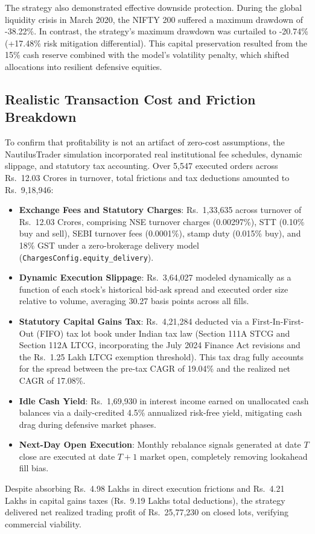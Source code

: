 The strategy also demonstrated effective downside protection. During the global liquidity crisis in March 2020, the NIFTY 200 suffered a maximum drawdown of -38.22\%. In contrast, the strategy's maximum drawdown was curtailed to -20.74\% (+17.48\% risk mitigation differential). This capital preservation resulted from the 15\% cash reserve combined with the model's volatility penalty, which shifted allocations into resilient defensive equities.

\subsection{Realistic Transaction Cost and Friction Breakdown}
To confirm that profitability is not an artifact of zero-cost assumptions, the NautilusTrader simulation incorporated real institutional fee schedules, dynamic slippage, and statutory tax accounting. Over 5,547 executed orders across \textsf{Rs.~}12.03 Crores in turnover, total frictions and tax deductions amounted to \textsf{Rs.~}9,18,946:
\begin{itemize}
    \item \textbf{Exchange Fees and Statutory Charges}: \textsf{Rs.~}1,33,635 across turnover of \textsf{Rs.~}12.03 Crores, comprising NSE turnover charges (0.00297\%), STT (0.10\% buy and sell), SEBI turnover fees (0.0001\%), stamp duty (0.015\% buy), and 18\% GST under a zero-brokerage delivery model (\texttt{ChargesConfig.equity\_delivery}).
    \item \textbf{Dynamic Execution Slippage}: \textsf{Rs.~}3,64,027 modeled dynamically as a function of each stock's historical bid-ask spread and executed order size relative to volume, averaging 30.27 basis points across all fills.
    \item \textbf{Statutory Capital Gains Tax}: \textsf{Rs.~}4,21,284 deducted via a First-In-First-Out (FIFO) tax lot book under Indian tax law (Section 111A STCG and Section 112A LTCG, incorporating the July 2024 Finance Act revisions and the \textsf{Rs.~}1.25 Lakh LTCG exemption threshold). This tax drag fully accounts for the spread between the pre-tax CAGR of 19.04\% and the realized net CAGR of 17.08\%.
    \item \textbf{Idle Cash Yield}: \textsf{Rs.~}1,69,930 in interest income earned on unallocated cash balances via a daily-credited 4.5\% annualized risk-free yield, mitigating cash drag during defensive market phases.
    \item \textbf{Next-Day Open Execution}: Monthly rebalance signals generated at date $T$ close are executed at date $T+1$ market open, completely removing lookahead fill bias.
\end{itemize}
Despite absorbing \textsf{Rs.~}4.98 Lakhs in direct execution frictions and \textsf{Rs.~}4.21 Lakhs in capital gains taxes (\textsf{Rs.~}9.19 Lakhs total deductions), the strategy delivered net realized trading profit of \textsf{Rs.~}25,77,230 on closed lots, verifying commercial viability.


